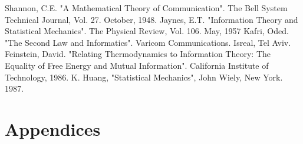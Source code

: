 \documentclass[letterpaper,10pt,english]{article}
\begin{document}
{\begin{thebibliography}{99}
 Shannon, C.E. "A Mathematical Theory of Communication". The Bell System Technical Journal, Vol. 27. October, 1948.
 Jaynes, E.T. "Information Theory and Statistical Mechanics". The Physical Review, Vol. 106. May, 1957
 Kafri, Oded. "The Second Law and Informatics". Varicom Communications. Isreal, Tel Aviv.
 Feinstein, David. "Relating Thermodynamics to Information Theory: The Equality of Free Energy and Mutual Information". California Institute of Technology, 1986. 
 K. Huang, "Statistical Mechanics", John Wiely, New York. 1987. 
\end{thebibliography}
\section*{Appendices} 
}
\end{document}
